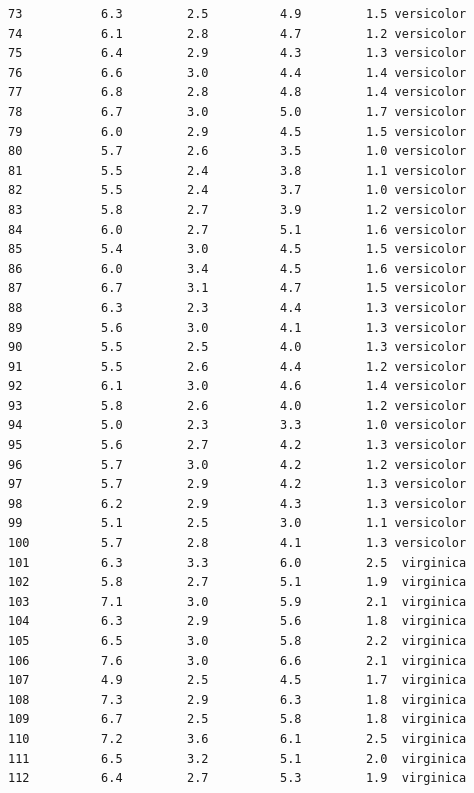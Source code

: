 \documentclass[
  brazilian,
]{book}
\begin{document}
\begin{verbatim}
73           6.3         2.5          4.9         1.5 versicolor
74           6.1         2.8          4.7         1.2 versicolor
75           6.4         2.9          4.3         1.3 versicolor
76           6.6         3.0          4.4         1.4 versicolor
77           6.8         2.8          4.8         1.4 versicolor
78           6.7         3.0          5.0         1.7 versicolor
79           6.0         2.9          4.5         1.5 versicolor
80           5.7         2.6          3.5         1.0 versicolor
81           5.5         2.4          3.8         1.1 versicolor
82           5.5         2.4          3.7         1.0 versicolor
83           5.8         2.7          3.9         1.2 versicolor
84           6.0         2.7          5.1         1.6 versicolor
85           5.4         3.0          4.5         1.5 versicolor
86           6.0         3.4          4.5         1.6 versicolor
87           6.7         3.1          4.7         1.5 versicolor
88           6.3         2.3          4.4         1.3 versicolor
89           5.6         3.0          4.1         1.3 versicolor
90           5.5         2.5          4.0         1.3 versicolor
91           5.5         2.6          4.4         1.2 versicolor
92           6.1         3.0          4.6         1.4 versicolor
93           5.8         2.6          4.0         1.2 versicolor
94           5.0         2.3          3.3         1.0 versicolor
95           5.6         2.7          4.2         1.3 versicolor
96           5.7         3.0          4.2         1.2 versicolor
97           5.7         2.9          4.2         1.3 versicolor
98           6.2         2.9          4.3         1.3 versicolor
99           5.1         2.5          3.0         1.1 versicolor
100          5.7         2.8          4.1         1.3 versicolor
101          6.3         3.3          6.0         2.5  virginica
102          5.8         2.7          5.1         1.9  virginica
103          7.1         3.0          5.9         2.1  virginica
104          6.3         2.9          5.6         1.8  virginica
105          6.5         3.0          5.8         2.2  virginica
106          7.6         3.0          6.6         2.1  virginica
107          4.9         2.5          4.5         1.7  virginica
108          7.3         2.9          6.3         1.8  virginica
109          6.7         2.5          5.8         1.8  virginica
110          7.2         3.6          6.1         2.5  virginica
111          6.5         3.2          5.1         2.0  virginica
112          6.4         2.7          5.3         1.9  virginica

\end{verbatim}
\end{document}
